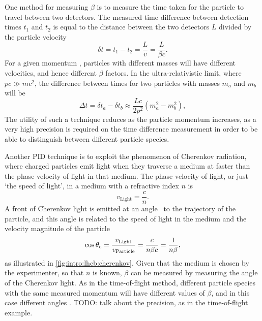 One method for measuring $\beta$ is to measure the time taken for the particle 
to travel between two detectors.
The measured time difference between detection times $t_{1}$ and $t_{2}$ is 
equal to the distance between the two detectors $L$ divided by the particle 
velocity
\begin{equation}
  \delta t = t_{1} - t_{2} = \frac{L}{v}
           = \frac{L}{\beta c}.
\end{equation}
For a given momentum \ptot, particles with different masses will have different 
velocities, and hence different $\beta$ factors.
In the ultra-relativistic limit, where $pc \gg mc^{2}$, the difference between 
times for two particles with masses $m_{a}$ and $m_{b}$ will be
\begin{equation}
  \Delta t = \delta t_{a} - \delta t_{b}
           \approx \frac{Lc}{2p^{2}}(m_{a}^{2} - m_{b}^{2}),
\end{equation}
The utility of such a technique reduces as the particle momentum increases, as 
a very high precision is required on the time difference measurement in order 
to be able to distinguish between different particle species.

Another \ac{PID} technique is to exploit the phenomenon of Cherenkov radiation, 
where charged particles emit light when they traverse a medium at faster than 
the phase velocity of light in that medium.
The phase velocity of light, or just `the speed of light', in a medium with a 
refractive index $n$ is
\begin{equation}
  v_{\text{Light}} = \frac{c}{n}.
\end{equation}
A front of Cherenkov light is emitted at an angle \cherenkovangle\ to the 
trajectory of the particle, and this angle is related to the speed of light in 
the medium and the velocity magnitude of the particle
\begin{equation}
  \cos{\ensuremath{\theta_{c}}} = \frac{v_{\text{Light}}}{v_{\text{Particle}}}
                        = \frac{c}{n\beta c}
                        = \frac{1}{n\beta},
\end{equation}
as illustrated in \cref{fig:intro:lhcb:cherenkov}.
Given that the medium is chosen by the experimenter, so that $n$ is known, 
$\beta$ can be measured by measuring the angle of the Cherenkov light.
As in the time-of-flight method, different particle species with the same 
measured momentum will have different values of $\beta$, and in this case 
different angles \cherenkovangle.
TODO: talk about the precision, as in the time-of-flight example.

